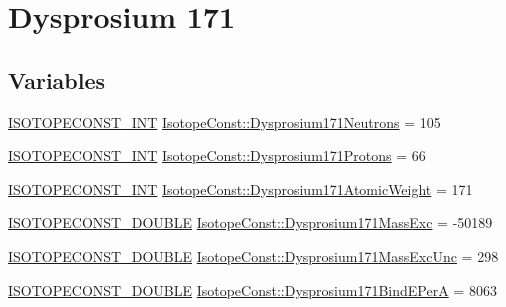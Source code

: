 \hypertarget{group___isotope_const-_dysprosium-_dy171}{}\section{Dysprosium 171}
\label{group___isotope_const-_dysprosium-_dy171}
\subsection*{Variables}
\begin{DoxyCompactItemize}
\item 
\mbox{\hyperlink{group___isotope_const-_macros_ga5f18360b3e99483a35c32d789e62621c}{I\+S\+O\+T\+O\+P\+E\+C\+O\+N\+S\+T\+\_\+\+I\+NT}} \mbox{\hyperlink{group___isotope_const-_dysprosium-_dy171_gae2e4396d60152ffcf77a91fb98de72d9}{Isotope\+Const\+::\+Dysprosium171\+Neutrons}} = 105
\item 
\mbox{\hyperlink{group___isotope_const-_macros_ga5f18360b3e99483a35c32d789e62621c}{I\+S\+O\+T\+O\+P\+E\+C\+O\+N\+S\+T\+\_\+\+I\+NT}} \mbox{\hyperlink{group___isotope_const-_dysprosium-_dy171_gac4c5e2db60372df765a6f7c75164a69c}{Isotope\+Const\+::\+Dysprosium171\+Protons}} = 66
\item 
\mbox{\hyperlink{group___isotope_const-_macros_ga5f18360b3e99483a35c32d789e62621c}{I\+S\+O\+T\+O\+P\+E\+C\+O\+N\+S\+T\+\_\+\+I\+NT}} \mbox{\hyperlink{group___isotope_const-_dysprosium-_dy171_gae7ba9962b1e9279fb837cdad62a54343}{Isotope\+Const\+::\+Dysprosium171\+Atomic\+Weight}} = 171
\item 
\mbox{\hyperlink{group___isotope_const-_macros_ga8f45a7272ce02c0b4c65c44636ed719a}{I\+S\+O\+T\+O\+P\+E\+C\+O\+N\+S\+T\+\_\+\+D\+O\+U\+B\+LE}} \mbox{\hyperlink{group___isotope_const-_dysprosium-_dy171_gae6b4960b96add4d6b9cf2449b8ae58ad}{Isotope\+Const\+::\+Dysprosium171\+Mass\+Exc}} = -\/50189
\item 
\mbox{\hyperlink{group___isotope_const-_macros_ga8f45a7272ce02c0b4c65c44636ed719a}{I\+S\+O\+T\+O\+P\+E\+C\+O\+N\+S\+T\+\_\+\+D\+O\+U\+B\+LE}} \mbox{\hyperlink{group___isotope_const-_dysprosium-_dy171_ga6ae61955f233a50b9fa7587c39c529cf}{Isotope\+Const\+::\+Dysprosium171\+Mass\+Exc\+Unc}} = 298
\item 
\mbox{\hyperlink{group___isotope_const-_macros_ga8f45a7272ce02c0b4c65c44636ed719a}{I\+S\+O\+T\+O\+P\+E\+C\+O\+N\+S\+T\+\_\+\+D\+O\+U\+B\+LE}} \mbox{\hyperlink{group___isotope_const-_dysprosium-_dy171_ga767b9abab56f034486c348a0d5339b23}{Isotope\+Const\+::\+Dysprosium171\+Bind\+E\+PerA}} = 8063
\item 

\end{DoxyCompactItemize}
